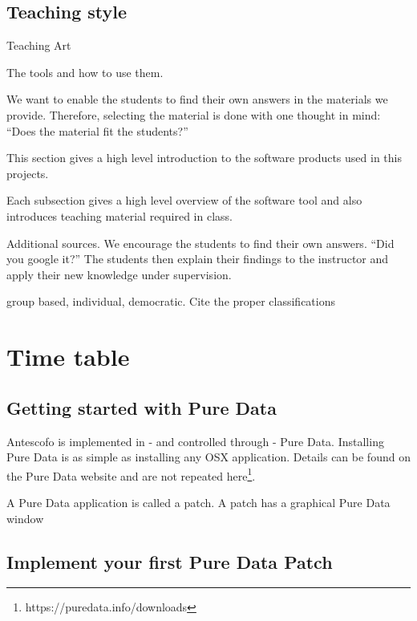 \documentclass[onecolumn,nocopyrightspace,preprint]{sigplanconf}
\begin{document}
\subsection{Teaching style}


Teaching Art~\cite{book:Peez2008}

The tools and how to use them.

We want to enable the students to find their own answers in the materials
we provide. Therefore, selecting the material is done with one thought
in mind: ``Does the material fit the students?''

This section gives a high level introduction to the software products
used in this projects.

Each subsection gives a high level overview of the software tool and
also introduces teaching material required in class.

Additional sources. We encourage the students to find their own answers.
``Did you google it?''
The students then explain their findings to the instructor and apply their
new knowledge under supervision.


group based, individual, democratic. Cite the proper classifications~\cite{book:Hubwieser2007}


\section{Time table}


\subsection{Getting started with Pure Data}



Antescofo is implemented in - and controlled through - Pure Data.
Installing Pure Data is as simple as installing any OSX application. Details can be found
on the Pure Data website and are not repeated here\footnote{https://puredata.info/downloads}.

A Pure Data application is called a patch. A patch has a graphical Pure Data window





\subsection{Implement your first Pure Data Patch}
\end{document}
